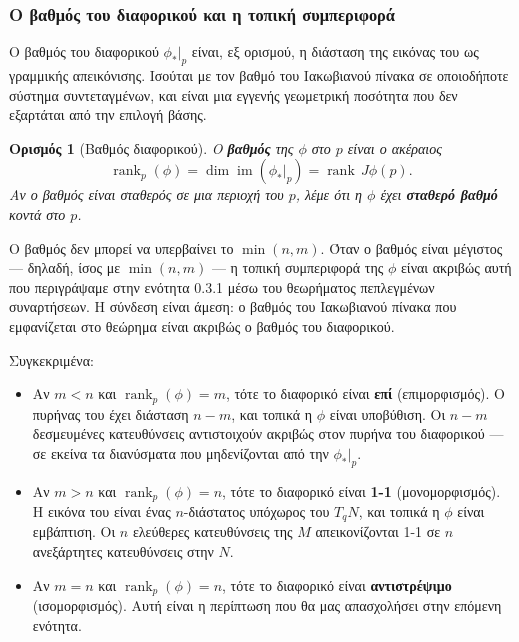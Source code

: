 \documentclass[11pt,a4paper,twoside,openright]{book}
\newtheorem{definition}[lemma]{Ορισμός}
\begin{document}
\subsubsection{Ο βαθμός του διαφορικού και η τοπική συμπεριφορά}

Ο βαθμός του διαφορικού $\phi_*|_p$ είναι, εξ ορισμού, η διάσταση της εικόνας του ως γραμμικής απεικόνισης. Ισούται με τον βαθμό του Ιακωβιανού πίνακα σε οποιοδήποτε σύστημα συντεταγμένων, και είναι μια εγγενής γεωμετρική ποσότητα που δεν εξαρτάται από την επιλογή βάσης.

\begin{definition}[Βαθμός διαφορικού]
Ο \textbf{βαθμός} της $\phi$ στο $p$ είναι ο ακέραιος
\begin{equation}
\operatorname{rank}_p(\phi) = \dim \operatorname{im}(\phi_*|_p) = \operatorname{rank}\, J\phi(p).
\end{equation}
Αν ο βαθμός είναι σταθερός σε μια περιοχή του $p$, λέμε ότι η $\phi$ έχει \textbf{σταθερό βαθμό} κοντά στο $p$.
\end{definition}

Ο βαθμός δεν μπορεί να υπερβαίνει το $\min(n, m)$. Όταν ο βαθμός είναι μέγιστος --- δηλαδή, ίσος με $\min(n, m)$ --- η τοπική συμπεριφορά της $\phi$ είναι ακριβώς αυτή που περιγράψαμε στην ενότητα 0.3.1 μέσω του θεωρήματος πεπλεγμένων συναρτήσεων. Η σύνδεση είναι άμεση: ο βαθμός του Ιακωβιανού πίνακα που εμφανίζεται στο θεώρημα είναι ακριβώς ο βαθμός του διαφορικού.

Συγκεκριμένα:
\begin{itemize}
\item Αν $m < n$ και $\operatorname{rank}_p(\phi) = m$, τότε το διαφορικό είναι \textbf{επί} (επιμορφισμός). Ο πυρήνας του έχει διάσταση $n - m$, και τοπικά η $\phi$ είναι υποβύθιση. Οι $n - m$ δεσμευμένες κατευθύνσεις αντιστοιχούν ακριβώς στον πυρήνα του διαφορικού --- σε εκείνα τα διανύσματα που μηδενίζονται από την $\phi_*|_p$.

\item Αν $m > n$ και $\operatorname{rank}_p(\phi) = n$, τότε το διαφορικό είναι \textbf{1-1} (μονομορφισμός). Η εικόνα του είναι ένας $n$-διάστατος υπόχωρος του $T_qN$, και τοπικά η $\phi$ είναι εμβάπτιση. Οι $n$ ελεύθερες κατευθύνσεις της $M$ απεικονίζονται 1-1 σε $n$ ανεξάρτητες κατευθύνσεις στην $N$.

\item Αν $m = n$ και $\operatorname{rank}_p(\phi) = n$, τότε το διαφορικό είναι \textbf{αντιστρέψιμο} (ισομορφισμός). Αυτή είναι η περίπτωση που θα μας απασχολήσει στην επόμενη ενότητα.
\end{itemize}
\end{document}
